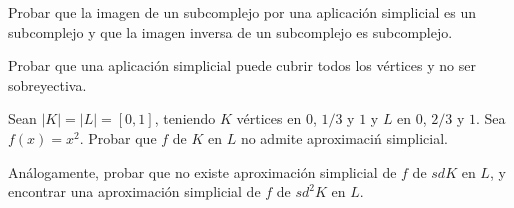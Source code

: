 \documentclass[twoside]{article}
\begin{document}
\newpage

\begin{ejercicio}{1.15}
Probar que la imagen de un subcomplejo por una aplicación simplicial es un subcomplejo y que la imagen inversa de un subcomplejo es subcomplejo.
\end{ejercicio}
\begin{solucion}
\end{solucion}

\newpage

\begin{ejercicio}{1.16}
Probar que una aplicación simplicial puede cubrir todos los vértices y no ser sobreyectiva.
\end{ejercicio}
\begin{solucion}
\end{solucion}

\newpage

\begin{ejercicio}{1.17}
Sean $|K| = |L| = [0,1]$, teniendo $K$ vértices en $0$, $1/3$ y $1$ y $L$ en $0$, $2/3$ y $1$.
Sea $f(x) = x^2$. Probar que $f$ de $K$ en $L$ no admite aproximaciń simplicial.

Análogamente, probar que no existe aproximación simplicial de $f$ de $sd K$ en $L$, y encontrar una aproximación simplicial de $f$ de $sd^2 K$ en $L$.
\end{ejercicio}
\begin{solucion}
\end{solucion}
\end{document}
